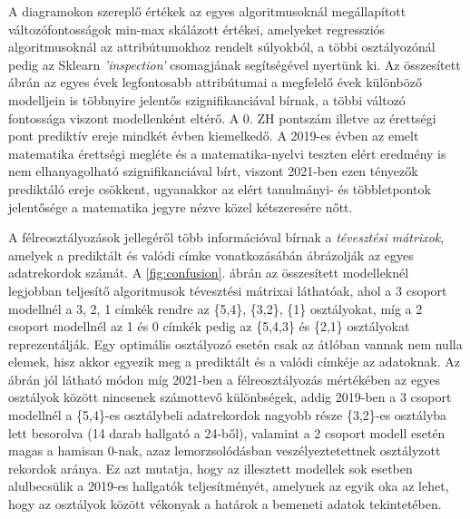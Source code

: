\documentclass[12pt]{article}
\begin{document}
%	



\noindent A diagramokon szereplő értékek az egyes algoritmusoknál megállapított változófontosságok min-max skálázott értékei, amelyeket regressziós algoritmusoknál az attribútumokhoz rendelt súlyokból, a többi osztályozónál pedig az Sklearn \textit{'inspection'} csomagjának segítségével nyertünk ki. Az összesített ábrán az egyes évek legfontosabb attribútumai a megfelelő évek különböző modelljein is többnyire jelentős szignifikanciával bírnak, a többi változó fontossága viszont modellenként eltérő. A 0. ZH pontszám illetve az érettségi pont prediktív ereje mindkét évben kiemelkedő. A 2019-es évben az emelt matematika érettségi megléte és a matematika-nyelvi teszten elért eredmény is nem elhanyagolható szignifikanciával bírt, viszont 2021-ben ezen tényezők prediktáló ereje csökkent, ugyanakkor az elért tanulmányi- és többletpontok jelentősége a matematika jegyre nézve közel kétszeresére nőtt.

A félreosztályozások jellegéről több információval bírnak a \emph{tévesztési mátrixok}, amelyek a prediktált és valódi címke vonatkozásábán ábrázolják az egyes adatrekordok számát. A \ref{fig:confusion}. ábrán az összesített modelleknél legjobban teljesítő algoritmusok tévesztési mátrixai láthatóak, ahol a 3 csoport modellnél a 3, 2, 1 címkék rendre az \{5,4\}, \{3,2\}, \{1\} osztályokat, míg a 2 csoport modellnél az 1 és 0 címkék pedig az \{5,4,3\} és \{2,1\} osztályokat reprezentálják. Egy optimális osztályozó esetén csak az átlóban vannak nem nulla elemek, hisz akkor egyezik meg a prediktált és a valódi címkéje az adatoknak. Az ábrán jól látható módon míg 2021-ben a félreosztályozás mértékében az egyes osztályok között nincsenek számottevő különbségek, addig 2019-ben a 3 csoport modellnél a \{5,4\}-es osztálybeli adatrekordok nagyobb része \{3,2\}-es osztályba lett besorolva (14 darab hallgató a 24-ből), valamint a 2 csoport modell esetén magas a hamisan 0-nak, azaz lemorzsolódásban veszélyeztetettnek osztályzott rekordok aránya. Ez azt mutatja, hogy az illesztett modellek sok esetben alulbecsülik a 2019-es hallgatók teljesítményét, amelynek az egyik oka az lehet, hogy az osztályok között vékonyak a határok a bemeneti adatok tekintetében.
\end{document}
